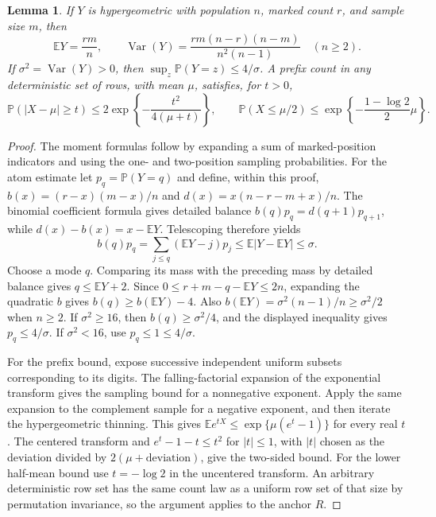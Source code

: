 \documentclass[11pt]{article}
\numberwithin{equation}{section}
\newtheorem{lemma}[theorem]{Lemma}
\theoremstyle{definition}
\theoremstyle{remark}
\newcommand{\E}{\mathbb E}
\newcommand{\Pp}{\mathbb P}
\newcommand{\Var}{\operatorname{Var}}
\newcommand{\1}{\mathbf 1}
\begin{document}
\begin{lemma}%
\label{lem:upper-atoms}
If $Y$ is hypergeometric with population $n$, marked count $r$, and
sample size $m$, then
\[
 \E Y=\frac{rm}{n},\qquad
 \Var(Y)=\frac{rm(n-r)(n-m)}{n^2(n-1)}\quad(n\ge2).
\]
If $\sigma^2=\Var(Y)>0$, then $\sup_z\Pp(Y=z)\le4/\sigma$.
A prefix count in any deterministic set of rows, with mean $\mu$,
satisfies, for $t>0$,
\[
 \Pp(|X-\mu|\ge t)\le2\exp\left\{-\frac{t^2}{4(\mu+t)}\right\},
 \qquad
\Pp(X\le\mu/2)\le\exp\left\{-\frac{1-\log2}{2}\mu\right\}.
\]
\end{lemma}
\begin{proof}
The moment formulas follow by expanding a sum of marked-position
indicators and using the one- and two-position sampling probabilities.
For the atom estimate let $p_q=\Pp(Y=q)$ and define, within this proof,
$b(x)=(r-x)(m-x)/n$ and
$d(x)=x(n-r-m+x)/n$. The binomial coefficient formula gives detailed
balance $b(q)p_q=d(q+1)p_{q+1}$, while
$d(x)-b(x)=x-\E Y$. Telescoping therefore yields
\[
 b(q)p_q=\sum_{j\le q}(\E Y-j)p_j
       \le\E|Y-\E Y|\le\sigma.
\]
Choose a mode $q$. Comparing its mass with the preceding mass by
detailed balance gives $q\le\E Y+2$. Since
$0\le r+m-q-\E Y\le2n$, expanding the quadratic $b$ gives
$b(q)\ge b(\E Y)-4$. Also
$b(\E Y)=\sigma^2(n-1)/n\ge\sigma^2/2$ when $n\ge2$.
If $\sigma^2\ge16$, then $b(q)\ge\sigma^2/4$, and the displayed
inequality gives $p_q\le4/\sigma$. If $\sigma^2<16$, use
$p_q\le1\le4/\sigma$.

For the prefix bound, expose successive independent uniform subsets
corresponding to its digits. The falling-factorial expansion of the
exponential transform gives the sampling bound for a nonnegative
exponent. Apply the same expansion to the complement sample for a
negative exponent, and then iterate the hypergeometric thinning.
This gives $\E e^{tX}\le\exp\{\mu(e^t-1)\}$ for every real $t$.
The centered transform and $e^t-1-t\le t^2$ for $|t|\le1$,
with $|t|$ chosen as the deviation divided by $2(\mu+\text{deviation})$,
give the two-sided bound. For the lower half-mean bound use
$t=-\log2$ in the uncentered transform. An arbitrary deterministic
row set has the same count law as a uniform row set of that size by
permutation invariance, so the argument applies to the anchor $R$.
\end{proof}
\end{document}
